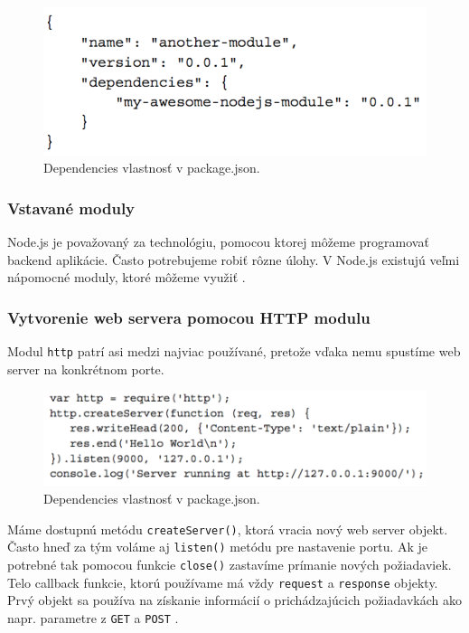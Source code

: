 \begin{figure}[H]
  \centering
  \includegraphics[scale=0.7]{img/npm/npm-overview-dependency.png}
   \caption{Dependencies vlastnosť v package.json.}
  \label{img-npm-dependencies}
\end{figure}

\subsubsection{Vstavané moduly}
Node.js je považovaný za technológiu, pomocou ktorej môžeme programovať backend aplikácie. Často potrebujeme robiť rôzne úlohy. V Node.js existujú veľmi nápomocné moduly, ktoré môžeme využiť \cite{nodejs-by-example}.

\subsubsection{Vytvorenie web servera pomocou HTTP modulu}
Modul \verb|http| patrí asi medzi najviac používané, pretože vďaka nemu spustíme web server na konkrétnom porte.

\begin{figure}[H]
  \centering
  \includegraphics[scale=0.7]{img/npm/npm-http-module.png}
  \caption{Dependencies vlastnosť v package.json.}
  \label{img-npm-http}
\end{figure}

Máme dostupnú metódu \verb|createServer()|, ktorá vracia nový web server objekt. Často hneď za tým voláme aj \verb|listen()| metódu pre nastavenie portu. Ak je potrebné tak pomocou funkcie \verb|close()| zastavíme prímanie nových požiadaviek. Telo callback funkcie, ktorú používame má vždy \verb|request| a \verb|response| objekty. Prvý objekt sa používa na získanie informácií o prichádzajúcich požiadavkách ako napr. parametre z \verb|GET| a \verb|POST| \cite{nodejs-by-example}.


